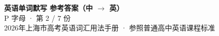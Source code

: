 \documentclass[10pt,a4paper]{article}
\begin{document}
\pagestyle{plain}

\begin{center}
{\LARGE\bfseries 英语单词默写 \quad 参考答案（中 $\to$ 英）}\\[0.22em]
{\large P 字母 · 第 2 / 7 份}\\[0.18em]
{\small 2026年上海市高考英语词汇用法手册 · 参照普通高中英语课程标准}
\end{center}

\vspace{0.2em}
\noindent{\color{rulegray}\rule{\textwidth}{0.8pt}}

\vspace{0.35em}

\vspace{0.25em}
\renewcommand{\arraystretch}{1.32}
\end{document}
